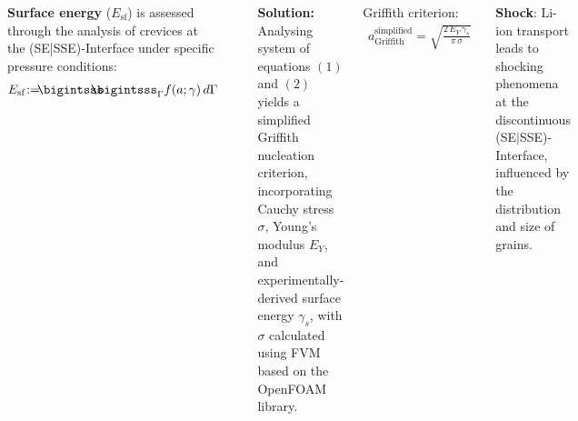 \documentclass[25pt, a0paper,
portrait,
margin=2mm, 
innermargin=2mm, 
blockverticalspace=7mm, %
colspace=2mm, %
subcolspace=0mm]{tikzposter}
\makeatletter
\newcommand*{\inputfig}[3][htb]{{
    \def\fps@figure{#1}
    \def\DIR{#2}
    \def\LABEL{#3}
    \graphicspath{{\DIR/}}
    
}}
\makeatother
\begin{document}
\begin{columns}
{\begin{minipage}{0.35\textwidth}
\begin{minipage}{0.5\textwidth}
			\end{minipage}
			\hfill 
			\begin{minipage}{0.49\textwidth}
				\begin{mdframed}
					\textbf{Surface energy} ($E_{\text{sf}}$)
					is assessed through the analysis
					of crevices at the (SE|SSE)-Interface
					under specific pressure conditions:
					\begin{align*}
						E_{\text{sf}} \! := \!\!\!
						\bigintsss\!\!\!\!\!\!\bigintsss_{\Gamma} f(a;\gamma) \, d\Gamma
					\end{align*}
				\end{mdframed}
			\end{minipage}
		\end{minipage}
		\begin{minipage}{0.27\textwidth}
			\begin{mdframed}
				\begin{center}
					\inputfig{floats/contour_figs_Griffith_xx_Ta_pressure_crevice_298K_noframed}{contour_figs_Griffith_xx_Ta_pressure_crevice_298K_noframed}
				\end{center}
				\vspace{-4mm}
			\end{mdframed}
		\end{minipage}
		\begin{minipage}{0.1\textwidth}
			\begin{mdframed}
				\textbf{Solution:}
				Analysing system of equations $(1)$ and $(2)$ yields
				a simplified Griffith nucleation criterion,
				incorporating Cauchy stress $\sigma$,
				Young's modulus $E_{Y}$, and
				experimentally-derived surface energy $\gamma_{s}$,
				with $\sigma$ calculated using FVM 
				based on the OpenFOAM library.
			\end{mdframed}
			\begin{mdframed}
				Griffith criterion:
				\begin{align*}
					a_{\text{Griffith}}^{\text{simplified}} \!=\! 
					\sqrt{\frac{2\,E_{Y}\,\gamma_{s}}{\pi\,\sigma}}
				\end{align*}
			\end{mdframed}
		\end{minipage}
		\begin{mdframed}
			\textbf{Shock}: 
			Li-ion transport leads to shocking phenomena 
			at the discontinuous (SE$|$SSE)-Interface, 
			influenced by the distribution and size of grains.
			\begin{center}				
				\inputfig{floats/characsin_rotate_semicircle_135246mix_horizontal}{characsin_rotate_semicircle_135246mix_horizontal}
			\end{center}
		\end{mdframed}
		\vspace{-3mm}
	}
\end{columns}
\end{document}
